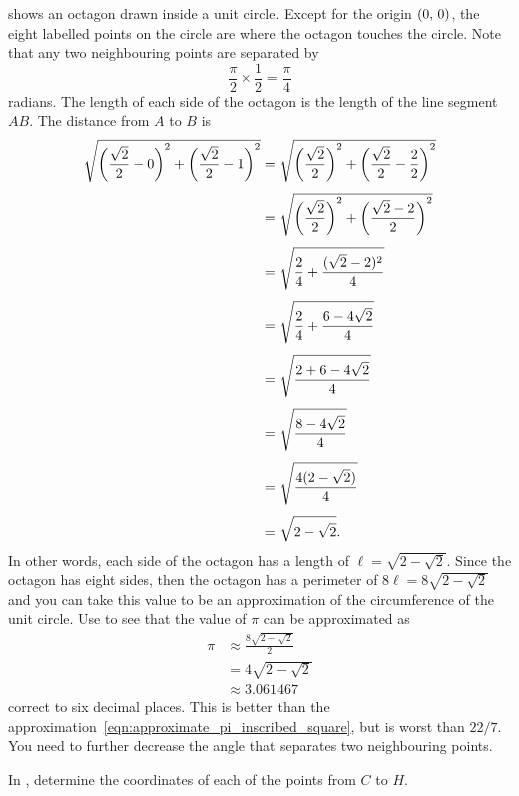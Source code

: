 \documentclass[a4paper,oneside,12pt]{article}
\begin{document}
 shows an octagon drawn inside a
unit circle.  Except for the origin $\tuple{0}{0}$, the eight labelled
points on the circle are where the octagon touches the circle.  Note
that any two neighbouring points are separated by
\[
\frac{\pi}{2} \times \frac{1}{2}
=
\frac{\pi}{4}
\]
radians.  The length of each side of the octagon is the length of the
line segment $AB$.  The distance from $A$ to $B$ is
\begin{align*}
\sqrt{
  \parenthesis*{\frac{\sqrt{2}}{2} - 0}^2
  +
  \parenthesis*{\frac{\sqrt{2}}{2} - 1}^2
}
&=
\sqrt{
  \parenthesis*{\frac{\sqrt{2}}{2}}^2
  +
  \parenthesis*{\frac{\sqrt{2}}{2} - \frac{2}{2}}^2
} \\[4pt]
&=
\sqrt{
  \parenthesis*{\frac{\sqrt{2}}{2}}^2
  +
  \parenthesis*{\frac{\sqrt{2} - 2}{2}}^2
} \\[4pt]
&=
\sqrt{
  \frac{2}{4}
  +
  \frac{(\sqrt{2} - 2)^2}{4}
} \\[4pt]
&=
\sqrt{
  \frac{2}{4}
  +
  \frac{6 - 4\sqrt{2}}{4}
} \\[4pt]
&=
\sqrt{
  \frac{
    2 + 6 - 4\sqrt{2}
  }{
    4
  }
} \\[4pt]
&=
\sqrt{
  \frac{
    8 - 4\sqrt{2}
  }{
    4
  }
} \\[4pt]
&=
\sqrt{
  \frac{
    4(2 - \sqrt{2})
  }{
    4
  }
} \\[4pt]
&=
\sqrt{
  2 - \sqrt{2}
}.
\end{align*}
In other words, each side of the octagon has a length of
$\ell = \sqrt{2 - \sqrt{2}}$.  Since the octagon has eight sides, then
the octagon has a perimeter of $8\ell = 8\sqrt{2 - \sqrt{2}}$ and you
can take this value to be an approximation of the circumference of the
unit circle.  Use  to see
that the value of $\pi$ can be approximated as
\begin{align*}
\pi
&\approx
\frac{
  8\sqrt{2 - \sqrt{2}}
}{
  2
} \\[4pt]
&=
4\sqrt{2 - \sqrt{2}} \\[4pt]
&\approx
3.061467
\end{align*}
correct to six decimal places.  This is better than the
approximation~\eqref{eqn:approximate_pi_inscribed_square}, but is
worst than $22 / 7$.  You need to further decrease the angle that
separates two neighbouring points.

\begin{exercise}
In , determine the coordinates of
each of the points from $C$ to $H$.
\end{exercise}
\end{document}

